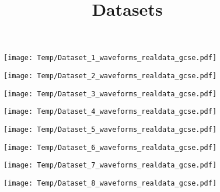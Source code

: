 \documentclass[14pt,a4paper]{extarticle}
\title{Datasets}
\author{}
\date{}
\begin{document}
\begin{figure}
\centering
\texttt{[image: Temp/Dataset\_1\_waveforms\_realdata\_gcse.pdf]}
\end{figure}

\begin{figure}
\centering
\texttt{[image: Temp/Dataset\_2\_waveforms\_realdata\_gcse.pdf]}
\end{figure}

\begin{figure}
\centering
\texttt{[image: Temp/Dataset\_3\_waveforms\_realdata\_gcse.pdf]}
\end{figure}

\begin{figure}
\centering
\texttt{[image: Temp/Dataset\_4\_waveforms\_realdata\_gcse.pdf]}
\end{figure}

\begin{figure}
\centering
\texttt{[image: Temp/Dataset\_5\_waveforms\_realdata\_gcse.pdf]}
\end{figure}

\begin{figure}
\centering
\texttt{[image: Temp/Dataset\_6\_waveforms\_realdata\_gcse.pdf]}
\end{figure}

\begin{figure}
\centering
\texttt{[image: Temp/Dataset\_7\_waveforms\_realdata\_gcse.pdf]}
\end{figure}

\begin{figure}
\centering
\texttt{[image: Temp/Dataset\_8\_waveforms\_realdata\_gcse.pdf]}
\end{figure}
\end{document}
